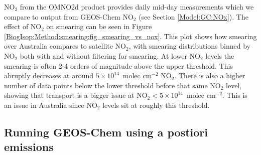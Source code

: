       NO$_2$ from the OMNO2d product provides daily mid-day measurements which we compare to output from GEOS-Chem NO$_2$ (see Section \ref{Model:GC:NOx}).
      The effect of NO$_2$ on smearing can be seen in Figure \ref{BiogIsop:Method:smearing:fig_smearing_vs_nox}.
      This plot shows how smearing over Australia compares to satellite NO$_2$, with smearing distributions binned by NO$_2$ both with and without filtering for smearing.
      At lower NO$_2$ levels the smearing is often 2-4 orders of magnitude above the upper threshold. 
      This abruptly decreases at around $5 \times 10^{14} $~molec cm$^{-2}$ NO$_2$.
      There is also a higher number of data points below the lower threshold before that same NO$_2$ level, showing that transport is a bigger issue at NO$_2 < 5 \times 10^{14} $~molec cm$^{-2}$. 
      This is an issue in Australia since NO$_2$ levels sit at roughly this threshold.
      
      
  \subsection{Running GEOS-Chem using a postiori emissions}
  \label{BioIsop:method:scaled}
    
